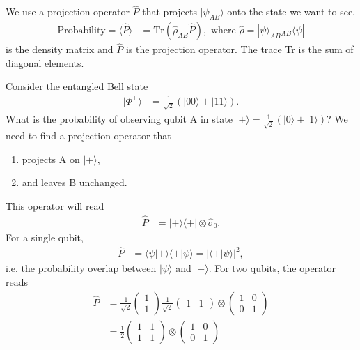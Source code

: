 \documentclass[lasers.tex]{subfiles}
\begin{document}
We use a projection operator $\hat{P}$ that projects $|\psi_{AB}\rangle$ onto the state we want to see.
\begin{align}
    \text{Probability} = \langle\hat{P}\rangle &= \text{Tr}(\hat{\rho}_{AB}\hat{P}), \text{ where } \hat{\rho} = |\psi\rangle_{AB} {}_{AB}\langle\psi|
\end{align}
is the density matrix and $\hat{P}$ is the projection operator. 
The trace Tr is the sum of diagonal elements.
\begin{example}
    Consider the entangled Bell state
    \begin{align}
        |\Phi^+\rangle &= \frac{1}{\sqrt{2}}\left(|00\rangle+|11\rangle\right).
    \end{align}
    What is the probability of observing qubit A in state $|+\rangle=\frac{1}{\sqrt{2}}(|0\rangle+|1\rangle)$?
    We need to find a projection operator that
    \begin{enumerate}
        \item projects A on $|+\rangle$,
        \item and leaves B unchanged.
    \end{enumerate}
    This operator will read
    \begin{align}
        \hat{P} &= |+\rangle\langle+| \otimes \hat{\sigma}_0.
    \end{align}
    For a single qubit, 
    \begin{align}
        \hat{P} &= \langle\psi|+\rangle\langle+|\psi\rangle = |\langle+|\psi\rangle|^2,
    \end{align}
    i.e. the probability overlap between $|\psi\rangle$ and $|+\rangle$.
    For two qubits, the operator reads
    \begin{align}
        \hat{P} &= \frac{1}{\sqrt{2}}\begin{pmatrix}1\\1\end{pmatrix}\frac{1}{\sqrt{2}}\begin{pmatrix} 1 & 1\end{pmatrix} \otimes \begin{pmatrix} 1 & 0 \\ 0 & 1\end{pmatrix} \\
                &= \frac12\begin{pmatrix} 1 & 1 \\ 1 & 1\end{pmatrix} \otimes \begin{pmatrix}1 & 0 \\ 0 & 1\end{pmatrix} \\

\end{align}
\end{example}
\end{document}
